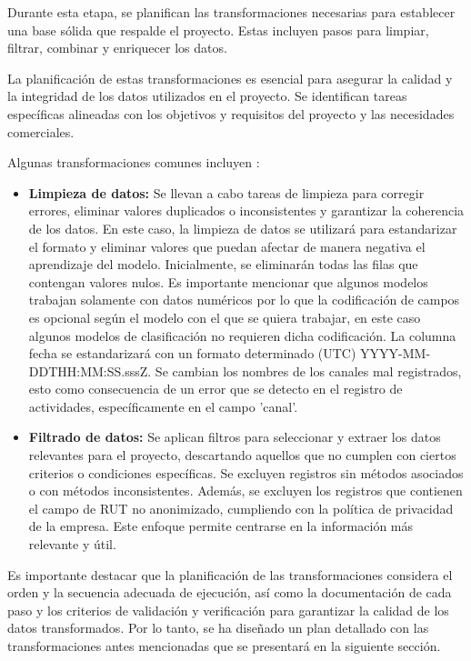 Durante esta etapa, se planifican las transformaciones necesarias para establecer una base sólida que respalde el proyecto. Estas incluyen pasos para limpiar, filtrar, combinar y enriquecer los datos.

La planificación de estas transformaciones es esencial para asegurar la calidad y la integridad de los datos utilizados en el proyecto. Se identifican tareas específicas alineadas con los objetivos y requisitos del proyecto y las necesidades comerciales.

Algunas transformaciones comunes incluyen \cite{etl-toolkit}:

\begin{itemize}
    \item \textbf{Limpieza de datos:} Se llevan a cabo tareas de limpieza para corregir errores, eliminar valores duplicados o inconsistentes y garantizar la coherencia de los datos. En este caso, la limpieza de datos se utilizará para estandarizar el formato y eliminar valores que puedan afectar de manera negativa el aprendizaje del modelo. Inicialmente, se eliminarán todas las filas que contengan valores nulos. Es importante mencionar que algunos modelos trabajan solamente con datos numéricos por lo que la codificación de campos es opcional según el modelo con el que se quiera trabajar, en este caso algunos modelos de clasificación no requieren dicha codificación.
    La columna fecha se estandarizará con un formato determinado (UTC) YYYY-MM-DDTHH:MM:SS.sssZ. Se cambian los nombres de los canales mal registrados, esto como consecuencia de un error que se detecto en el registro de actividades, específicamente en el campo 'canal'.

    \item \textbf{Filtrado de datos:} Se aplican filtros para seleccionar y extraer los datos relevantes para el proyecto, descartando aquellos que no cumplen con ciertos criterios o condiciones específicas. Se excluyen registros sin métodos asociados o con métodos inconsistentes. Además, se excluyen los registros que contienen el campo de RUT no anonimizado, cumpliendo con la política de privacidad de la empresa. Este enfoque permite centrarse en la información más relevante y útil.
\end{itemize}

Es importante destacar que la planificación de las transformaciones considera el orden y la secuencia adecuada de ejecución, así como la documentación de cada paso y los criterios de validación y verificación para garantizar la calidad de los datos transformados. Por lo tanto, se ha diseñado un plan detallado con las transformaciones antes mencionadas que se presentará en la siguiente sección.